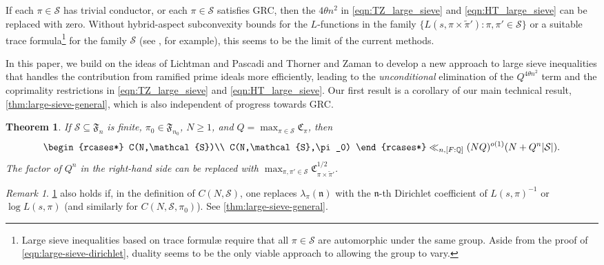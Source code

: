 \documentclass[11pt]{amsart}
\newtheorem{theorem}{Theorem}[section]
\theoremstyle{remark}
\newtheorem*{remark}{Remark}
\numberwithin{equation}{section}
\newcommand{\kn}{\mathfrak{n}}
\newcommand{\Q}{\mathbb{Q}}
\newcommand{\mS}{\mathcal{S}}
\renewcommand{\tilde}{\widetilde}
\begin{document}
If each $\pi\in\mathcal{S}$ has trivial conductor, or each $\pi\in\mathcal{S}$ satisfies GRC, then the $4\theta n^2$ in \eqref{eqn:TZ_large_sieve} and \eqref{eqn:HT_large_sieve} can be replaced with zero. Without hybrid-aspect subconvexity bounds for the $L$-functions in the family $\{L(s,\pi\times\widetilde{\pi}')\colon \pi,\pi'\in\mathcal{S}\}$ or a suitable trace formula\footnote{Large sieve inequalities based on trace formul{\ae} require that all $\pi \in \mS$ are automorphic under the same group. Aside from the proof of \eqref{eqn:large-sieve-dirichlet}, duality seems to be the only viable approach to allowing the group to vary.} for the family $\mathcal{S}$ (see \cite{blomer2023density,BlomerThorner,deshouillers1982kloosterman,jana2020applications}, for example), this seems to be the limit of the current methods.

In this paper, we build on the ideas of Lichtman and Pascadi \cite{lichtman2024density} and Thorner and Zaman \cite{TZ_GLn} to develop a new approach to large sieve inequalities that handles the contribution from ramified prime ideals more efficiently, leading to the {\it unconditional} elimination of the $Q^{4\theta n^2}$ term and the coprimality restrictions in \eqref{eqn:TZ_large_sieve} and \eqref{eqn:HT_large_sieve}.  Our first result is a corollary of our main technical result, \cref{thm:large-sieve-general}, which is also independent of progress towards GRC.

\begin{theorem}
\label{thm:large_sieve2}
If $\mathcal{S}\subseteq \mathfrak{F}_n$ is finite, $\pi_0\in\mathfrak{F}_{n_0}$, $N\geq 1$, and $Q=\max_{\pi\in\mathcal{S}}\mathfrak{C}_{\pi}$, then
\[
\begin{rcases*}
C(N,\mathcal{S})\\
C(N,\mathcal{S},\pi_0)
\end{rcases*}\ll_{n,[F:\Q]} (NQ)^{o(1)}(N+Q^n|\mathcal{S}|).
\]
The factor of $Q^n$ in the right-hand side can be replaced with $\max_{\pi,\pi'\in\mathcal{S}}\mathfrak{C}_{\pi\times\tilde{\pi}'}^{1/2}$.
\end{theorem}

\begin{remark}
\cref{thm:large_sieve2} also holds if, in the definition of $C(N, \mS)$, one replaces $\lambda_\pi(\kn)$ with the $\kn$-th Dirichlet coefficient of $L(s, \pi)^{-1}$ or $\log L(s, \pi)$ (and similarly for $C(N,\mathcal{S},\pi_0)$). See \cref{thm:large-sieve-general}.
\end{remark}
\end{document}

